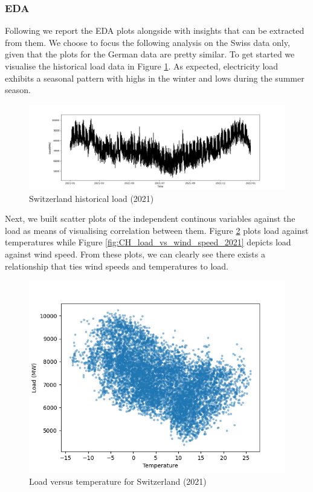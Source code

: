 \subsubsection{EDA}
Following we report the EDA plots alongside with insights that can be extracted from them. We choose to focus the following analysis on the Swiss data only, given that the plots for the German data are pretty similar.
To get started we visualise the historical load data in Figure \ref{fig:CH_historical_load_2021}. As expected, electricity load exhibits a seasonal pattern with highs in the winter and lows during the summer season.
\begin{figure}[!ht]
    \includegraphics[width=\textwidth]{images/CH_historical_load_2021.png}
    \caption{Switzerland historical load (2021)}
    \label{fig:CH_historical_load_2021}
\end{figure}
Next, we built scatter plots of the independent continous variables against the load as means of visualising correlation between them.
Figure \ref{fig:CH_load_vs_temperature_2021} plots load against temperatures while Figure \ref{fig:CH_load_vs_wind_speed_2021} depicts load against wind speed. From these plots, we can clearly see there exists a relationship that ties wind speeds and temperatures to load.

\begin{figure}[!ht]
    \includegraphics[width=\textwidth]{images/CH_load_vs_temperature_2021.png}
    \caption{Load versus temperature for Switzerland (2021)}
    \label{fig:CH_load_vs_temperature_2021}
\end{figure}

